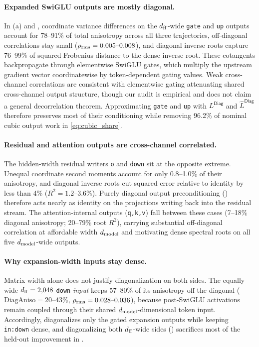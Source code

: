 \paragraph{Expanded SwiGLU outputs are mostly diagonal.}
In (a) and , coordinate variance differences on the $d_{\mathrm{ff}}$-wide \texttt{gate} and \texttt{up} outputs account for 78--91\% of total anisotropy across all three trajectories, off-diagonal correlations stay small ($\rho_{\rm rms}=0.005\text{--}0.008$), and diagonal inverse roots capture 76--99\% of squared Frobenius distance to the dense inverse root. These cotangents backpropagate through elementwise SwiGLU gates, which multiply the upstream gradient vector coordinatewise by token-dependent gating values. Weak cross-channel correlations are consistent with elementwise gating attenuating shared cross-channel output structure, though our audit is empirical and does not claim a general decorrelation theorem. Approximating \texttt{gate} and \texttt{up} with $L^{\mathsf{Diag}}$ and $\hat L^{\mathsf{Diag}}$ therefore preserves most of their conditioning while removing 96.2\% of nominal cubic output work in \cref{eq:cubic_share}.

\paragraph{Residual and attention outputs are cross-channel correlated.}
The hidden-width residual writers \texttt{o} and \texttt{down} sit at the opposite extreme. Unequal coordinate second moments account for only 0.8--1.0\% of their anisotropy, and diagonal inverse roots cut squared error relative to identity by less than 4\% ($R^2=1.2\text{--}3.6\%$). Purely diagonal output preconditioning () therefore acts nearly as identity on the projections writing back into the residual stream. The attention-internal outputs (\texttt{q,k,v}) fall between these cases (7--18\% diagonal anisotropy; 20--79\% root $R^2$), carrying substantial off-diagonal correlation at affordable width $d_{\mathrm{model}}$ and motivating dense spectral roots on all five $d_{\mathrm{model}}$-wide outputs.

\paragraph{Why expansion-width inputs stay dense.}
Matrix width alone does not justify diagonalization on both sides. The equally wide $d_{\mathrm{ff}}=2{,}048$ \texttt{down} \emph{input} keeps 57--80\% of its anisotropy off the diagonal ($\mathrm{DiagAniso}=20\text{--}43\%$, $\rho_{\rm rms}=0.028\text{--}0.036$), because post-SwiGLU activations remain coupled through their shared $d_{\mathrm{model}}$-dimensional token input. Accordingly,  diagonalizes only the gated expansion outputs while keeping \texttt{in:down} dense, and diagonalizing both $d_{\mathrm{ff}}$-wide sides () sacrifices most of the held-out improvement in .

